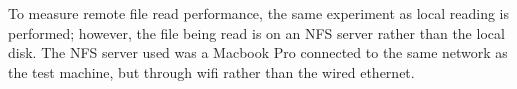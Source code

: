 To measure remote file read performance, the same experiment as local reading is performed; however, the file being read is on an NFS server rather than the local disk.
The NFS server used was a Macbook Pro connected to the same network as the test machine, but through wifi rather than the wired ethernet.